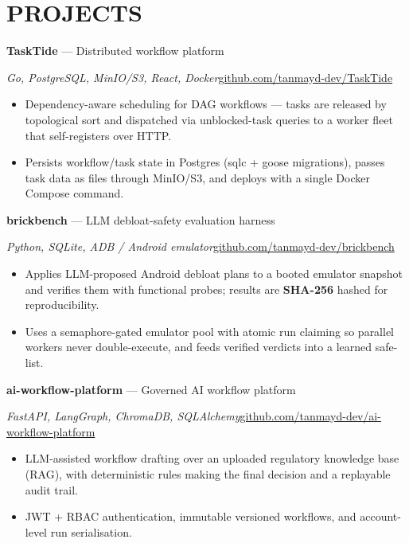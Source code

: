 \documentclass[10pt,a4paper]{article}
\newcommand{\projhead}[2]{\noindent\textbf{#1} --- #2\par}
\newcommand{\repolink}[1]{\hfill{\color{muted}\href{https://github.com/tanmayd-dev/#1}{github.com/tanmayd-dev/#1}}}
\begin{document}
\section*{PROJECTS}

\projhead{TaskTide}{Distributed workflow platform}
{\small\textit{Go, PostgreSQL, MinIO/S3, React, Docker}\repolink{TaskTide}}\\[1pt]
{\small
\begin{itemize}
  \item Dependency-aware scheduling for DAG workflows --- tasks are released by topological sort and dispatched via unblocked-task queries to a worker fleet that self-registers over HTTP.
  \item Persists workflow/task state in Postgres (sqlc + goose migrations), passes task data as files through MinIO/S3, and deploys with a single Docker Compose command.
\end{itemize}
}

\vspace{2pt}
\projhead{brickbench}{LLM debloat-safety evaluation harness}
{\small\textit{Python, SQLite, ADB / Android emulator}\repolink{brickbench}}\\[1pt]
{\small
\begin{itemize}
  \item Applies LLM-proposed Android debloat plans to a booted emulator snapshot and verifies them with functional probes; results are \textbf{SHA-256} hashed for reproducibility.
  \item Uses a semaphore-gated emulator pool with atomic run claiming so parallel workers never double-execute, and feeds verified verdicts into a learned safe-list.
\end{itemize}
}

\vspace{2pt}
\projhead{ai-workflow-platform}{Governed AI workflow platform}
{\small\textit{FastAPI, LangGraph, ChromaDB, SQLAlchemy}\repolink{ai-workflow-platform}}\\[1pt]
{\small
\begin{itemize}
  \item LLM-assisted workflow drafting over an uploaded regulatory knowledge base (RAG), with deterministic rules making the final decision and a replayable audit trail.
  \item JWT + RBAC authentication, immutable versioned workflows, and account-level run serialisation.
\end{itemize}
}
\end{document}
